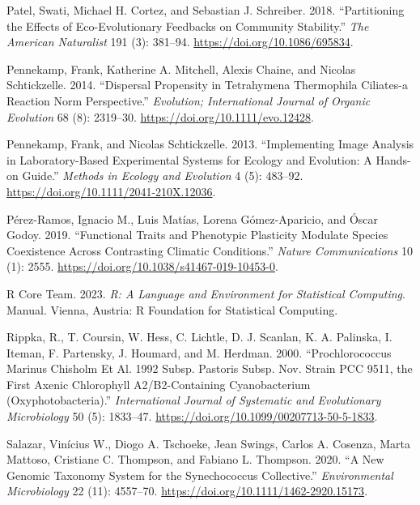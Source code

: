 \documentclass[
  letterpaper,
  DIV=11,
  numbers=noendperiod]{scrartcl}
\newlength{\cslhangindent}
\newenvironment{CSLReferences}[2] %
 {\begin{list}{}{%
  \setlength{\itemindent}{0pt}
  \setlength{\leftmargin}{0pt}
  \setlength{\parsep}{0pt}
  \ifodd #1
   \setlength{\leftmargin}{\cslhangindent}
   \setlength{\itemindent}{-1\cslhangindent}
  \fi
  \setlength{\itemsep}{#2\baselineskip}}}
 {\end{list}}
\begin{document}
\begin{CSLReferences}{1}{0}
Patel, Swati, Michael H. Cortez, and Sebastian J. Schreiber. 2018.
{``Partitioning the {Effects} of {Eco-Evolutionary Feedbacks} on
{Community Stability}.''} \emph{The American Naturalist} 191 (3):
381--94. \url{https://doi.org/10.1086/695834}.

Pennekamp, Frank, Katherine A. Mitchell, Alexis Chaine, and Nicolas
Schtickzelle. 2014. {``Dispersal Propensity in Tetrahymena Thermophila
Ciliates-a Reaction Norm Perspective.''} \emph{Evolution; International
Journal of Organic Evolution} 68 (8): 2319--30.
\url{https://doi.org/10.1111/evo.12428}.

Pennekamp, Frank, and Nicolas Schtickzelle. 2013. {``Implementing Image
Analysis in Laboratory-Based Experimental Systems for Ecology and
Evolution: {A} Hands-on Guide.''} \emph{Methods in Ecology and
Evolution} 4 (5): 483--92.
\url{https://doi.org/10.1111/2041-210X.12036}.

Pérez-Ramos, Ignacio M., Luis Matías, Lorena Gómez-Aparicio, and Óscar
Godoy. 2019. {``Functional Traits and Phenotypic Plasticity Modulate
Species Coexistence Across Contrasting Climatic Conditions.''}
\emph{Nature Communications} 10 (1): 2555.
\url{https://doi.org/10.1038/s41467-019-10453-0}.

R Core Team. 2023. \emph{R: {A} Language and Environment for Statistical
Computing}. Manual. {Vienna, Austria}: {R Foundation for Statistical
Computing}.

Rippka, R., T. Coursin, W. Hess, C. Lichtle, D. J. Scanlan, K. A.
Palinska, I. Iteman, F. Partensky, J. Houmard, and M. Herdman. 2000.
{``Prochlorococcus Marinus {Chisholm} Et Al. 1992 Subsp. Pastoris Subsp.
Nov. Strain {PCC} 9511, the First Axenic Chlorophyll A2/B2-Containing
Cyanobacterium ({Oxyphotobacteria}).''} \emph{International Journal of
Systematic and Evolutionary Microbiology} 50 (5): 1833--47.
\url{https://doi.org/10.1099/00207713-50-5-1833}.

Salazar, Vinícius W., Diogo A. Tschoeke, Jean Swings, Carlos A. Cosenza,
Marta Mattoso, Cristiane C. Thompson, and Fabiano L. Thompson. 2020.
{``A New Genomic Taxonomy System for the {Synechococcus} Collective.''}
\emph{Environmental Microbiology} 22 (11): 4557--70.
\url{https://doi.org/10.1111/1462-2920.15173}.


\end{CSLReferences}
\end{document}
